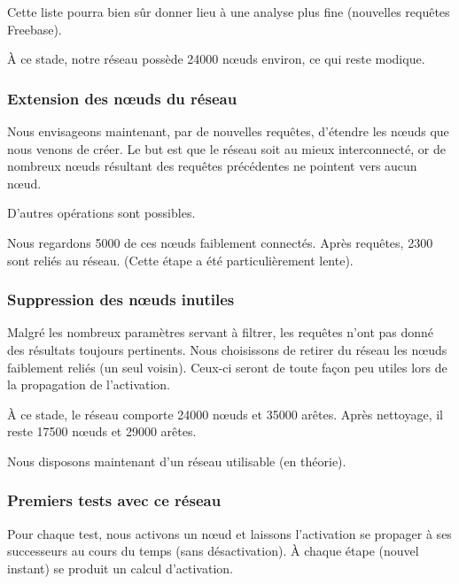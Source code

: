 \documentclass[a4paper,12pt]{article}
\begin{document}
Cette liste pourra bien s\^ur donner lieu \`a une analyse plus fine (nouvelles requ\^etes Freebase).

\`A ce stade, notre r\'eseau poss\`ede 24000 nœuds environ, ce qui reste modique.

\subsubsection{Extension des nœuds du r\'eseau}

Nous envisageons maintenant, par de nouvelles requ\^etes, d'\'etendre les nœuds que nous venons de cr\'eer. Le but est que le r\'eseau soit au mieux interconnect\'e, or de nombreux nœuds r\'esultant des requ\^etes pr\'ec\'edentes ne pointent vers aucun nœud.

D'autres op\'erations sont possibles.

Nous regardons 5000 de ces nœuds faiblement connect\'es. Apr\`es requ\^etes, 2300 sont reli\'es au r\'eseau. (Cette \'etape a \'et\'e particuli\`erement lente).

\subsubsection{Suppression des nœuds inutiles}

Malgr\'e les nombreux param\`etres servant \`a filtrer, les requ\^etes n'ont pas donn\'e des r\'esultats toujours pertinents. Nous choisissons de retirer du r\'eseau les nœuds faiblement reli\'es (un seul voisin). Ceux-ci seront de toute fa\c{c}on peu utiles lors de la propagation de l'activation.

\`A  ce stade, le r\'eseau comporte 24000 nœuds et 35000 ar\^etes. Apr\`es nettoyage, il reste 17500 nœuds et 29000 ar\^etes.

Nous disposons maintenant d'un r\'eseau utilisable (en th\'eorie).

\subsubsection{Premiers tests avec ce r\'eseau}

Pour chaque test, nous activons un nœud et laissons l'activation se propager \`a ses successeurs au cours du temps (sans d\'esactivation). \`A chaque \'etape (nouvel instant) se produit un calcul d'activation.
\end{document}
